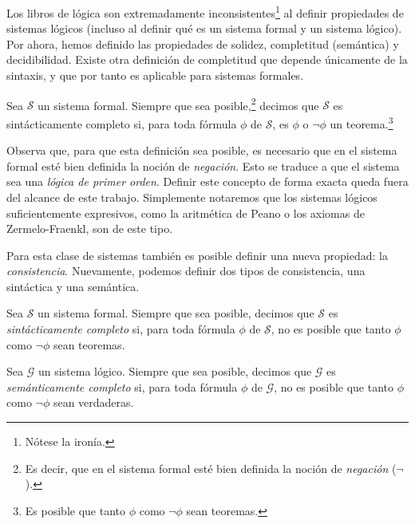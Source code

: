 Los libros de lógica son extremadamente inconsistentes\footnote{Nótese la ironía.} al definir propiedades de sistemas lógicos (incluso al definir qué es un sistema formal y un sistema lógico). Por ahora, hemos definido las propiedades de solidez, completitud (semántica) y decidibilidad. Existe otra definición de completitud que depende únicamente de la sintaxis, y que por tanto es aplicable para sistemas formales. \cite{Kleene1971}

\begin{definicion}\label{def:completitud-sintactica}
Sea $\mathcal{S}$ un sistema formal. Siempre que sea posible,\footnote{Es decir, que en el sistema formal esté bien definida la noción de \emph{negación} ($\neg$).} decimos que $\mathcal{S}$ es sintácticamente completo si, para toda fórmula $\phi$ de $\mathcal{S}$, es $\phi$ o $\neg\phi$ un teorema.\footnote{Es posible que tanto $\phi$ como $\neg\phi$ sean teoremas.}
\end{definicion}

Observa que, para que esta definición sea posible, es necesario que en el sistema formal esté bien definida la noción de \emph{negación}. Esto se traduce a que el sistema sea una \emph{lógica de primer orden}. Definir este concepto de forma exacta queda fuera del alcance de este trabajo. Simplemente notaremos que los sistemas lógicos suficientemente expresivos, como la aritmética de Peano o los axiomas de Zermelo-Fraenkl, son de este tipo.

Para esta clase de sistemas también es posible definir una nueva propiedad: la \emph{consistencia}. Nuevamente, podemos definir dos tipos de consistencia, una sintáctica y una semántica.

\begin{definicion}\label{def:consistencia-sintactica}
Sea $\mathcal{S}$ un sistema formal. Siempre que sea posible, decimos que $\mathcal{S}$ es \emph{sintácticamente completo} si, para toda fórmula $\phi$ de $\mathcal{S}$, no es posible que tanto $\phi$ como $\neg\phi$ sean teoremas.
\end{definicion}

\begin{definicion}\label{def:consistencia-semantica}
Sea $\mathcal{G}$ un sistema lógico. Siempre que sea posible, decimos que $\mathcal{G}$ es \emph{semánticamente completo} si, para toda fórmula $\phi$ de $\mathcal{G}$, no es posible que tanto $\phi$ como $\neg\phi$ sean verdaderas.
\end{definicion}

